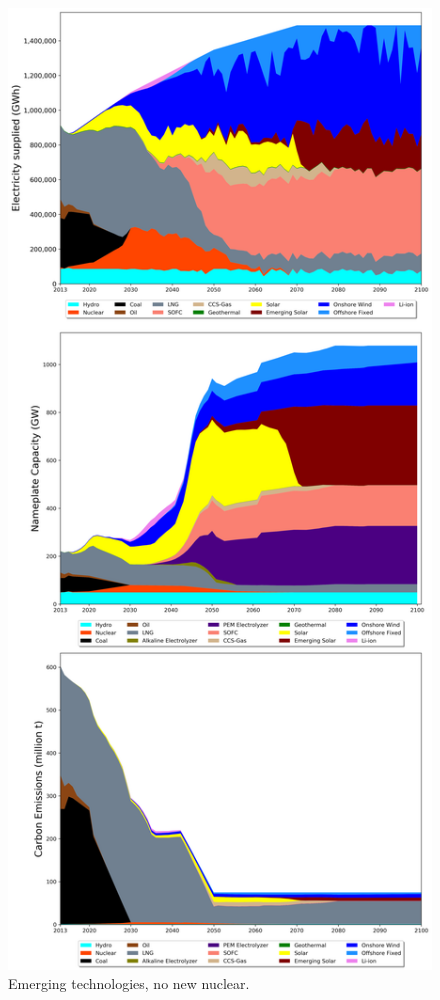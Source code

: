 \begin{figure}[h] 
\centering
\vspace*{-3cm}
\includegraphics[scale=0.41]{figures/newtechs_nonuc}
\caption{Emerging technologies, no new nuclear.}
\label{scen3}
\end{figure}

